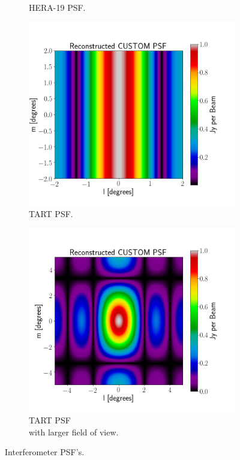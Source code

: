 \begin{figure}[H]
\begin{subfigure}[b]{0.49\textwidth}
    \caption{HERA-19 PSF.}
    \label{fig:HERA-19 PSF}
  \end{subfigure}
  \newline
  \begin{subfigure}[b]{0.49\textwidth}
    \includegraphics[width=\textwidth]{images/TART_PSF.png}
    \caption{TART PSF.}
    \label{fig:TART PSF}
  \end{subfigure}
  \begin{subfigure}[b]{0.49\textwidth}
    \includegraphics[width=\textwidth]{images/TART_PSF_CORRECT.png}
    \caption{TART PSF \\with larger field of view.}
    \label{fig:TART PSF FOV}
    \vspace{-4mm}
  \end{subfigure}
  \caption{Interferometer PSF's.}
\end{figure}

